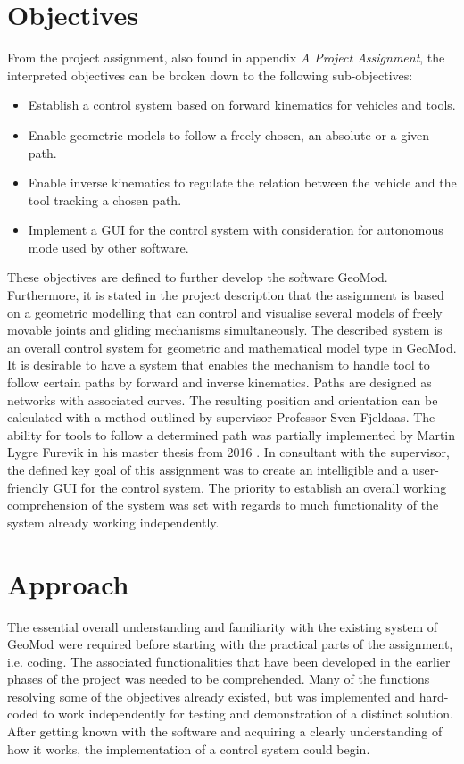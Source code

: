 \section{Objectives}
\label{chap:objectives}

From the project assignment, also found in appendix \textit{A Project Assignment}, the interpreted objectives can be broken down to the following sub-objectives:

\begin{itemize}
  \item Establish a control system based on forward kinematics for vehicles and tools.
  \item Enable geometric models to follow a freely chosen, an absolute or a given path.
  \item Enable inverse kinematics to regulate the relation between the vehicle and the tool tracking a chosen path.  
  \item Implement a GUI for the control system with consideration for autonomous mode used by other software.
\end{itemize}


\noindent These objectives are defined to further develop the software GeoMod. Furthermore, it is stated in the project description that the assignment is based on a geometric modelling that can control and visualise several models of freely movable joints and gliding mechanisms simultaneously. The described system is an overall control system for geometric and mathematical model type in GeoMod. It is desirable to have a system that enables the mechanism to handle tool to follow certain paths by forward and inverse kinematics. Paths are designed as networks with associated curves. The resulting position and orientation can be calculated with a method outlined by supervisor Professor Sven Fjeldaas. The ability for tools to follow a determined path was partially implemented by Martin Lygre Furevik in his master thesis from 2016 \cite{martin}. In consultant with the supervisor, the defined key goal of this assignment was to create an intelligible and a user-friendly GUI for the control system. The priority to establish an overall working comprehension of the system was set with regards to much functionality of the system already working independently.


\section{Approach}

The essential overall understanding and familiarity with the existing system of GeoMod were required before starting with the practical parts of the assignment, i.e. coding. The associated functionalities that have been developed in the earlier phases of the project was needed to be comprehended. Many of the functions resolving some of the objectives already existed, but was implemented and hard-coded to work independently for testing and demonstration of a distinct solution. After getting known with the software and acquiring a clearly understanding of how it works, the implementation of a control system could begin. 

